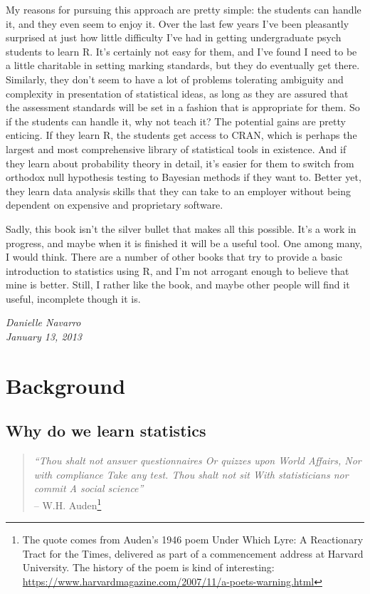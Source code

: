 \documentclass[
]{book}
\begin{document}
My reasons for pursuing this approach are pretty simple: the students
can handle it, and they even seem to enjoy it. Over the last few years
I've been pleasantly surprised at just how little difficulty I've had in
getting undergraduate psych students to learn R. It's certainly not easy
for them, and I've found I need to be a little charitable in setting
marking standards, but they do eventually get there. Similarly, they
don't seem to have a lot of problems tolerating ambiguity and complexity
in presentation of statistical ideas, as long as they are assured that
the assessment standards will be set in a fashion that is appropriate
for them. So if the students can handle it, why not teach it? The
potential gains are pretty enticing. If they learn R, the students get
access to CRAN, which is perhaps the largest and most comprehensive
library of statistical tools in existence. And if they learn about
probability theory in detail, it's easier for them to switch from
orthodox null hypothesis testing to Bayesian methods if they want to.
Better yet, they learn data analysis skills that they can take to an
employer without being dependent on expensive and proprietary software.

Sadly, this book isn't the silver bullet that makes all this possible.
It's a work in progress, and maybe when it is finished it will be a
useful tool. One among many, I would think. There are a number of other
books that try to provide a basic introduction to statistics using R,
and I'm not arrogant enough to believe that mine is better. Still, I
rather like the book, and maybe other people will find it useful,
incomplete though it is.

\emph{Danielle Navarro\\
January 13, 2013}

\hypertarget{part-background}{%
\part{Background}\label{part-background}}

\hypertarget{why-do-we-learn-statistics}{%
\chapter{Why do we learn statistics}\label{why-do-we-learn-statistics}}

\begin{quote}
\emph{``Thou shalt not answer questionnaires\emph{\hfill\break
}Or quizzes upon World Affairs,\emph{\hfill\break
}Nor with compliance\emph{\hfill\break
}Take any test. Thou shalt not sit\emph{\hfill\break
}With statisticians nor commit\emph{\hfill\break
}A social science''}\\
-- W.H. Auden\footnote{The quote comes from Auden's 1946 poem Under Which Lyre: A Reactionary Tract for the Times, delivered as part of a commencement address at Harvard University. The history of the poem is kind of interesting: \url{https://www.harvardmagazine.com/2007/11/a-poets-warning.html}}
\end{quote}
\end{document}
